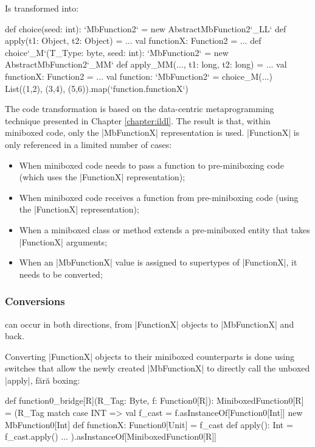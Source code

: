 Is transformed into:

\begin{lstlisting-nobreak}
 def choice(seed: int): `MbFunction2` =
   new AbstractMbFunction2`_LL` {
     def apply(t1: Object, t2: Object) = ...
     val functionX: Function2 = ...
   }
 def choice`_M`(T_Type: byte, seed: int): `MbFunction2` =
   new AbstractMbFunction2`_MM` {
     def apply_MM(..., t1: long, t2: long) = ...
     val functionX: Function2 = ...
   }
 val function: `MbFunction2` = choice_M(...)
 List((1,2), (3,4), (5,6)).map(`function.functionX`)
\end{lstlisting-nobreak}

The code transformation is based on the data-centric metaprogramming technique presented in Chapter \ref{chapter:ildl}. The result is that, within miniboxed code, only the |MbFunctionX| representation is used. |FunctionX| is only referenced in a limited number of cases:
\begin{itemize}
  \item When miniboxed code needs to pass a function to pre-miniboxing code (which uses the |FunctionX| representation);
  \item When miniboxed code receives a function from pre-miniboxing code (using the |FunctionX| representation);
  \item When a miniboxed class or method extends a pre-miniboxed entity that takes |FunctionX| arguments;
  \item When an |MbFunctionX| value is assigned to supertypes of |FunctionX|, it needs to be converted;
\end{itemize}

\subsubsection*{Conversions} can occur in both directions, from |FunctionX| objects to |MbFunctionX| and back.

Converting |FunctionX| objects to their miniboxed counterparts is done using switches that allow the newly created |MbFunctionX| to directly call the unboxed |apply|, fără boxing:

\begin{lstlisting-nobreak}
 def function0_bridge[R](R_Tag: Byte, f: Function0[R]): MiniboxedFunction0[R] =
   (R_Tag match {
     case INT =>
       val f_cast = f.asInstanceOf[Function0[Int]]
       new MbFunction0[Int] {
         def functionX: Function0[Unit] = f_cast
         def apply(): Int = f_cast.apply()
       }
     ...
   }).asInstanceOf[MiniboxedFunction0[R]]
\end{lstlisting-nobreak}

